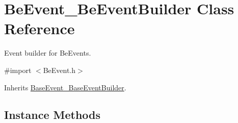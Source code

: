 \hypertarget{interface_be_event___be_event_builder}{}\section{Be\+Event\+\_\+\+Be\+Event\+Builder Class Reference}
\label{interface_be_event___be_event_builder}


Event builder for Be\+Events.  




{\ttfamily \#import $<$Be\+Event.\+h$>$}



Inherits \hyperlink{interface_base_event___base_event_builder}{Base\+Event\+\_\+\+Base\+Event\+Builder}.

\subsection*{Instance Methods}
